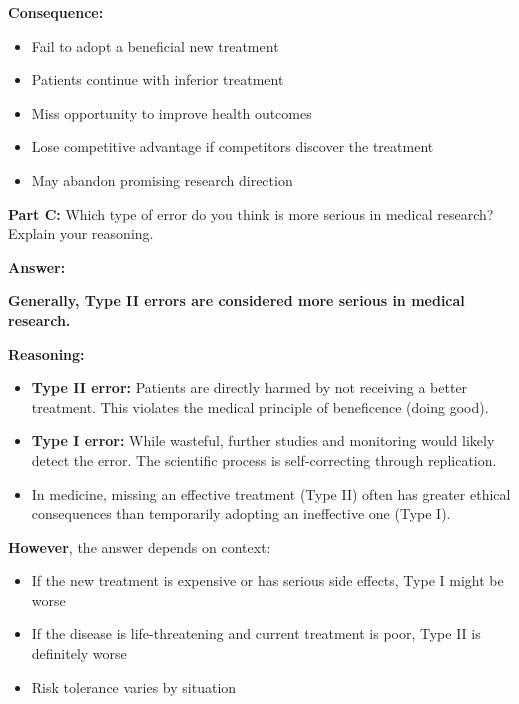 \documentclass[11pt]{article}
\begin{document}
\vspace{4pt}
\textbf{Consequence:}
\begin{itemize}
\item Fail to adopt a beneficial new treatment
\item Patients continue with inferior treatment
\item Miss opportunity to improve health outcomes
\item Lose competitive advantage if competitors discover the treatment
\item May abandon promising research direction
\end{itemize}

\vspace{12pt}

\textbf{Part C:} Which type of error do you think is more serious in medical research? Explain your reasoning.

\vspace{6pt}
\textcolor{answergreen}{\textbf{Answer:}}

\vspace{4pt}
\textbf{Generally, Type II errors are considered more serious in medical research.}

\vspace{6pt}
\textbf{Reasoning:}
\begin{itemize}
\item \textbf{Type II error:} Patients are directly harmed by not receiving a better treatment. This violates the medical principle of beneficence (doing good).

\vspace{2pt}
\item \textbf{Type I error:} While wasteful, further studies and monitoring would likely detect the error. The scientific process is self-correcting through replication.

\vspace{2pt}
\item In medicine, missing an effective treatment (Type II) often has greater ethical consequences than temporarily adopting an ineffective one (Type I).
\end{itemize}

\vspace{6pt}
\textbf{However}, the answer depends on context:
\begin{itemize}
\item If the new treatment is expensive or has serious side effects, Type I might be worse
\item If the disease is life-threatening and current treatment is poor, Type II is definitely worse
\item Risk tolerance varies by situation
\end{itemize}
\end{document}

